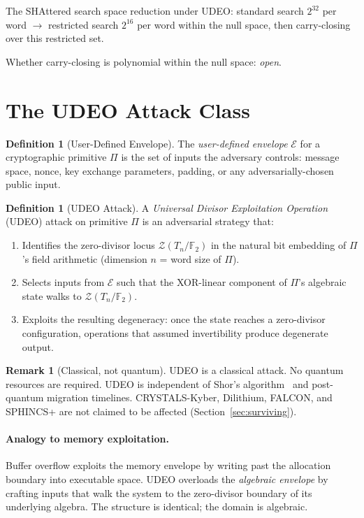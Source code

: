 \documentclass[runningheads]{llncs}
\theoremstyle{plain}
\theoremstyle{definition}
\newtheorem{definition}[theorem]{Definition}
\newtheorem{remark}[theorem]{Remark}
\newcommand{\GFtwo}{\mathbb{F}_2}
\newcommand{\ZDlocus}{\mathcal{Z}}
\begin{document}
The SHAttered search space reduction under UDEO:
standard search $2^{32}$ per word $\to$ restricted search $2^{16}$ per word
within the null space, then carry-closing over this restricted set.

Whether carry-closing is polynomial within the null space: \emph{open}.


\section{The UDEO Attack Class}
\label{sec:udeo}

\begin{definition}[User-Defined Envelope]
The \emph{user-defined envelope} $\mathcal{E}$ for a cryptographic primitive $\Pi$
is the set of inputs the adversary controls: message space, nonce, key exchange
parameters, padding, or any adversarially-chosen public input.
\end{definition}

\begin{definition}[UDEO Attack]
\label{def:udeo}
A \emph{Universal Divisor Exploitation Operation} (UDEO) attack on primitive $\Pi$
is an adversarial strategy that:
\begin{enumerate}
\item Identifies the zero-divisor locus $\ZDlocus(T_n/\GFtwo)$ in the natural
      bit embedding of $\Pi$'s field arithmetic (dimension $n$ = word size of $\Pi$).
\item Selects inputs from $\mathcal{E}$ such that the XOR-linear component of
      $\Pi$'s algebraic state walks to $\ZDlocus(T_n/\GFtwo)$.
\item Exploits the resulting degeneracy: once the state reaches a zero-divisor
      configuration, operations that assumed invertibility produce degenerate output.
\end{enumerate}
\end{definition}

\begin{remark}[Classical, not quantum]
UDEO is a classical attack. No quantum resources are required. UDEO is
independent of Shor's algorithm~\cite{Shor1994} and post-quantum migration
timelines. CRYSTALS-Kyber, Dilithium, FALCON, and SPHINCS+ are not claimed
to be affected (Section~\ref{sec:surviving}).
\end{remark}

\paragraph{Analogy to memory exploitation.}
Buffer overflow exploits the memory envelope by writing past the allocation
boundary into executable space. UDEO overloads the \emph{algebraic envelope}
by crafting inputs that walk the system to the zero-divisor boundary of its
underlying algebra. The structure is identical; the domain is algebraic.
\end{document}
